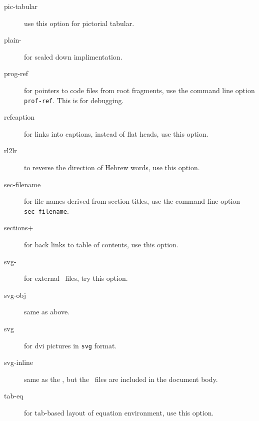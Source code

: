 \begin{description}



\item[pic-tabular] use this option for pictorial tabular.

\item[plain-] for scaled down implimentation.




\item[prog-ref] for pointers to code files from root fragments, use
  the command line option \verb=prof-ref=. This is for debugging.

\item[refcaption] for links into captions, instead of flat heads, use
  this option.

\item[rl2lr] to reverse the direction of Hebrew words, use this
  option.

\item[sec-filename] for file names derived from section titles, use
  the command line option \verb=sec-filename=.

\item[sections+] for back links to table of contents, use this option.


\item[svg-] for external \svg\ files, try this option.

\item[svg-obj] same as above.

\item[svg] for dvi pictures in \verb=svg= format.

\item[svg-inline] same as the , but the \svg\ files are included in the document body.

\item[tab-eq] for tab-based layout of equation environment, use this
  option.


\end{description}

